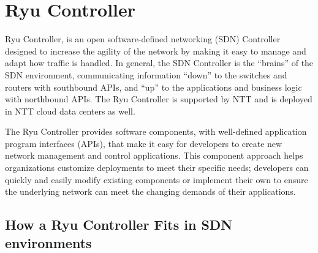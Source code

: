 \documentclass[]{report}
\begin{document}
\begin{minipage}{\linewidth}%

\label{fig:OFtable}
\end{minipage}

\section{Ryu Controller}

Ryu Controller, is an open software-defined networking (SDN) Controller designed to increase the agility of the network by making it easy to manage and adapt how traffic is handled. In general, the SDN Controller is the “brains” of the SDN environment, communicating information “down” to the switches and routers with southbound APIs, and “up” to the applications and business logic with northbound APIs. The Ryu Controller is supported by NTT and is deployed in NTT cloud data centers as well.

The Ryu Controller provides software components, with well-defined application program interfaces (APIs), that make it easy for developers to create new network management and control applications. This component approach helps organizations customize deployments to meet their specific needs; developers can quickly and easily modify existing components or implement their own to ensure the underlying network can meet the changing demands of their applications.



\subsection{How a Ryu Controller Fits in SDN environments}
\end{document}
